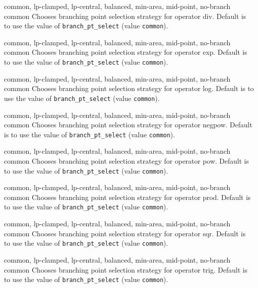 %
{\ttfamily common, lp-clamped, lp-central, balanced, min-area, mid-point, no-branch}%
{common}%
{Chooses branching point selection strategy for operator div.
Default is to use the value of \texttt{branch\_pt\_select} (value \texttt{common}).}%
{}

%
{\ttfamily common, lp-clamped, lp-central, balanced, min-area, mid-point, no-branch}%
{common}%
{Chooses branching point selection strategy for operator exp.
Default is to use the value of \texttt{branch\_pt\_select} (value \texttt{common}).}%
{}

%
{\ttfamily common, lp-clamped, lp-central, balanced, min-area, mid-point, no-branch}%
{common}%
{Chooses branching point selection strategy for operator log.
Default is to use the value of \texttt{branch\_pt\_select} (value \texttt{common}).}%
{}

%
{\ttfamily common, lp-clamped, lp-central, balanced, min-area, mid-point, no-branch}%
{common}%
{Chooses branching point selection strategy for operator negpow.
Default is to use the value of \texttt{branch\_pt\_select} (value \texttt{common}).}%
{}

%
{\ttfamily common, lp-clamped, lp-central, balanced, min-area, mid-point, no-branch}%
{common}%
{Chooses branching point selection strategy for operator pow.
Default is to use the value of \texttt{branch\_pt\_select} (value \texttt{common}).}%
{}

%
{\ttfamily common, lp-clamped, lp-central, balanced, min-area, mid-point, no-branch}%
{common}%
{Chooses branching point selection strategy for operator prod.
Default is to use the value of \texttt{branch\_pt\_select} (value \texttt{common}).}%
{}

%
{\ttfamily common, lp-clamped, lp-central, balanced, min-area, mid-point, no-branch}%
{common}%
{Chooses branching point selection strategy for operator sqr.
Default is to use the value of \texttt{branch\_pt\_select} (value \texttt{common}).}%
{}

%
{\ttfamily common, lp-clamped, lp-central, balanced, min-area, mid-point, no-branch}%
{common}%
{Chooses branching point selection strategy for operator trig.
Default is to use the value of \texttt{branch\_pt\_select} (value \texttt{common}).}%
{}

